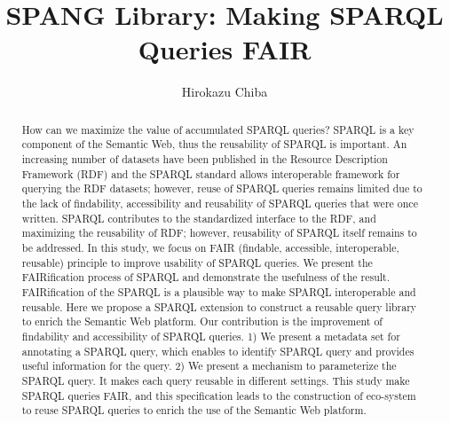 \documentclass[runningheads]{llncs}
\begin{document}
%
\title{SPANG Library: Making SPARQL Queries FAIR}
%
%
\author{Hirokazu Chiba}
%
%
%
\maketitle              %
%
\begin{abstract}
How can we maximize the value of accumulated SPARQL queries? 
SPARQL is a key component of the Semantic Web, thus the reusability of SPARQL is important.
An increasing number of datasets have been published in the Resource Description Framework (RDF) and the SPARQL standard allows interoperable framework for querying the RDF datasets; however, reuse of SPARQL queries remains limited due to the lack of findability, accessibility and reusability of SPARQL queries that were once written. 
SPARQL contributes to the standardized interface to the RDF, and maximizing the reusability of RDF; however, reusability of SPARQL itself remains to be addressed. 
In this study, we focus on FAIR (findable, accessible, interoperable,
reusable) principle to improve usability of SPARQL queries.
We present the FAIRification process of SPARQL and demonstrate the usefulness of the result.
FAIRification of the SPARQL is a plausible way to make SPARQL interoperable and reusable.
Here we propose a SPARQL extension to construct a reusable query library to enrich the Semantic Web platform.
Our contribution is the improvement of findability and accessibility of SPARQL queries.
1) We present a metadata set for annotating a SPARQL query, which
enables to identify SPARQL query and provides useful information for the query.
2) We present a mechanism to parameterize the SPARQL query.
It makes each query reusable in different settings.
This study make SPARQL queries FAIR, and this specification leads to the construction of eco-system to reuse SPARQL queries to enrich the use of the Semantic Web platform.


\end{abstract}
%
%
%
\end{document}
